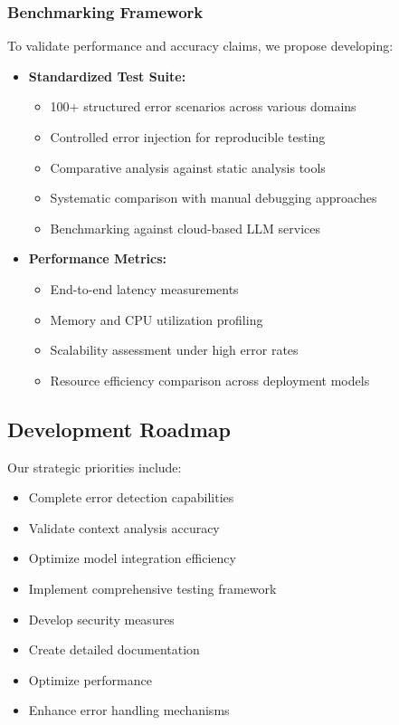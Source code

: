 \subsubsection{Benchmarking Framework}
To validate performance and accuracy claims, we propose developing:
\begin{itemize}
    \item \textbf{Standardized Test Suite:}
        \begin{itemize}
            \item 100+ structured error scenarios across various domains
            \item Controlled error injection for reproducible testing
            \item Comparative analysis against static analysis tools
            \item Systematic comparison with manual debugging approaches
            \item Benchmarking against cloud-based LLM services
        \end{itemize}
    \item \textbf{Performance Metrics:}
        \begin{itemize}
            \item End-to-end latency measurements
            \item Memory and CPU utilization profiling
            \item Scalability assessment under high error rates
            \item Resource efficiency comparison across deployment models
        \end{itemize}
\end{itemize}

\subsection{Development Roadmap}
Our strategic priorities include:
\begin{itemize}
    \item Complete error detection capabilities
    \item Validate context analysis accuracy
    \item Optimize model integration efficiency
    \item Implement comprehensive testing framework
    \item Develop security measures
    \item Create detailed documentation
    \item Optimize performance
    \item Enhance error handling mechanisms
\end{itemize}


